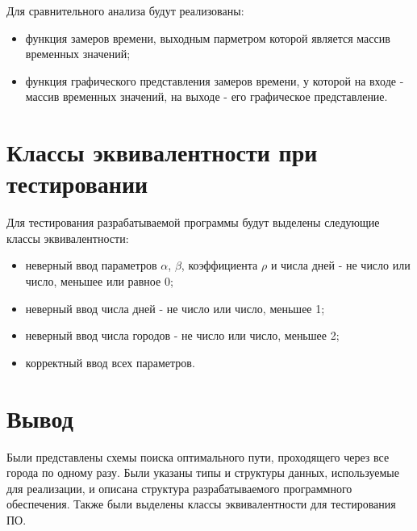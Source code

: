 Для сравнительного анализа будут реализованы:

\begin{itemize}
	\item функция замеров времени, выходным парметром которой является массив временных значений;
	\item функция графического представления замеров времени, у которой на входе - массив временных значений, на выходе - его графическое представление.
\end{itemize}

\section{Классы эквивалентности при тестировании}

Для тестирования разрабатываемой программы будут выделены следующие классы эквивалентности:

\begin{itemize}
	\item неверный ввод параметров $\alpha$, $\beta$, коэффициента $\rho$ и числа дней - не число или число, меньшее или равное 0;
	\item неверный ввод числа дней - не число или число, меньшее 1;
	\item неверный ввод числа городов - не число или число, меньшее 2;
	\item корректный ввод всех параметров.
\end{itemize}

\section{Вывод}

Были представлены схемы поиска оптимального пути, проходящего через все города по одному разу. Были указаны типы и структуры данных, используемые для реализации, и описана структура разрабатываемого программного обеспечения. Также были выделены классы эквивалентности для тестирования ПО.
